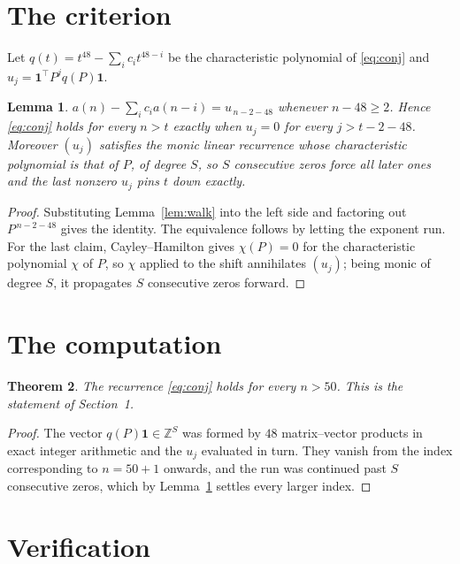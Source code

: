 \documentclass[11pt,a4paper]{article}
\theoremstyle{plain}
\newtheorem{theorem}{Theorem}
\newtheorem{lemma}[theorem]{Lemma}
\theoremstyle{definition}
\begin{document}
\section{The criterion}

Let $q(t)=t^{48}-\sum_i c_i t^{48-i}$ be the characteristic polynomial of
\eqref{eq:conj} and $u_j=\mathbf{1}^{\!\top}P^{j}q(P)\mathbf{1}$.

\begin{lemma}\label{lem:crit}
$a(n)-\sum_i c_i a(n-i)=u_{\,n-2-48}$ whenever $n-48\ge2$. Hence
\eqref{eq:conj} holds for every $n>t$ exactly when $u_j=0$ for every
$j>t-2-48$. Moreover $(u_j)$ satisfies the monic linear recurrence whose
characteristic polynomial is that of $P$, of degree $S$, so $S$ consecutive zeros force all
later ones and the last nonzero $u_j$ pins $t$ down exactly.
\end{lemma}

\begin{proof}
Substituting Lemma~\ref{lem:walk} into the left side and factoring out
$P^{\,n-2-48}$ gives the identity. The equivalence follows by letting the exponent
run. For the last claim, Cayley--Hamilton gives $\chi(P)=0$ for the characteristic
polynomial $\chi$ of $P$, so $\chi$ applied to the shift annihilates $(u_j)$; being monic of
degree $S$, it propagates $S$ consecutive zeros forward.
\end{proof}

\section{The computation}

\begin{theorem}
The recurrence \eqref{eq:conj} holds for every $n>50$. This is the statement of
Section~1.
\end{theorem}

\begin{proof}
The vector $q(P)\mathbf{1}\in\mathbb{Z}^{S}$ was formed by $48$ matrix--vector
products in exact integer arithmetic and the $u_j$ evaluated in turn. They vanish from the
index corresponding to $n=50+1$ onwards, and the run was continued past $S$ consecutive
zeros, which by Lemma~\ref{lem:crit} settles every larger index.
\end{proof}

\section{Verification}
\end{document}
